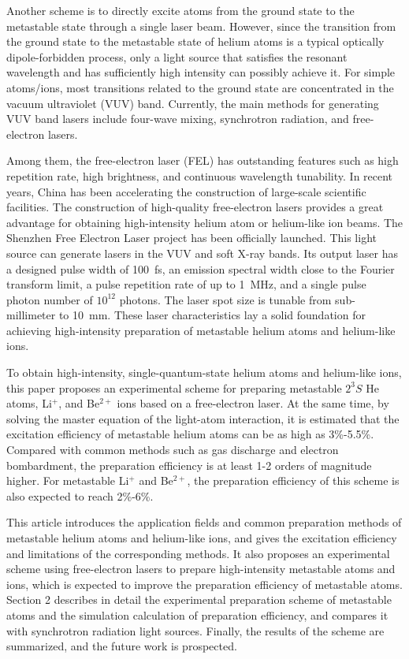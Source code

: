\documentclass[12pt,a4paper]{article}
\begin{document}
Another scheme is to directly excite atoms from the ground state to the metastable state through a single laser beam. However, since the transition from the ground state to the metastable state of helium atoms is a typical optically dipole-forbidden process, only a light source that satisfies the resonant wavelength and has sufficiently high intensity can possibly achieve it. For simple atoms/ions, most transitions related to the ground state are concentrated in the vacuum ultraviolet (VUV) band. Currently, the main methods for generating VUV band lasers include four-wave mixing, synchrotron radiation, and free-electron lasers.

Among them, the free-electron laser (FEL) has outstanding features such as high repetition rate, high brightness, and continuous wavelength tunability. In recent years, China has been accelerating the construction of large-scale scientific facilities. The construction of high-quality free-electron lasers provides a great advantage for obtaining high-intensity helium atom or helium-like ion beams. The Shenzhen Free Electron Laser project has been officially launched. This light source can generate lasers in the VUV and soft X-ray bands. Its output laser has a designed pulse width of \SI{100}{fs}, an emission spectral width close to the Fourier transform limit, a pulse repetition rate of up to \SI{1}{MHz}, and a single pulse photon number of $10^{12}$ photons. The laser spot size is tunable from sub-millimeter to \SI{10}{mm}. These laser characteristics lay a solid foundation for achieving high-intensity preparation of metastable helium atoms and helium-like ions.

To obtain high-intensity, single-quantum-state helium atoms and helium-like ions, this paper proposes an experimental scheme for preparing metastable $2^3S$ He atoms, Li$^{+}$, and Be$^{2+}$ ions based on a free-electron laser. At the same time, by solving the master equation of the light-atom interaction, it is estimated that the excitation efficiency of metastable helium atoms can be as high as 3\%-5.5\%. Compared with common methods such as gas discharge and electron bombardment, the preparation efficiency is at least 1-2 orders of magnitude higher. For metastable Li$^{+}$ and Be$^{2+}$, the preparation efficiency of this scheme is also expected to reach 2\%-6\%.

This article introduces the application fields and common preparation methods of metastable helium atoms and helium-like ions, and gives the excitation efficiency and limitations of the corresponding methods. It also proposes an experimental scheme using free-electron lasers to prepare high-intensity metastable atoms and ions, which is expected to improve the preparation efficiency of metastable atoms. Section 2 describes in detail the experimental preparation scheme of metastable atoms and the simulation calculation of preparation efficiency, and compares it with synchrotron radiation light sources. Finally, the results of the scheme are summarized, and the future work is prospected.
\end{document}
